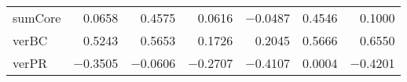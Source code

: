\begin{table}[!htbp]
\begin{tabular}{lrrrrrr}
            sumCore &   {\num{ 0.0658}} &   {\num{ 0.4575}} &   {\num{ 0.0616}} &   {\num{-0.0487}} &   {\num{ 0.4546}} &   {\num{ 0.1000}} \\
              verBC &   {\num{ 0.5243}} &   {\num{ 0.5653}} &   {\num{ 0.1726}} &   {\num{ 0.2045}} &   {\num{ 0.5666}} &   {\num{ 0.6550}} \\
              verPR &   {\num{-0.3505}} &   {\num{-0.0606}} &   {\num{-0.2707}} &   {\num{-0.4107}} &   {\num{ 0.0004}} &   {\num{-0.4201}} \\
        \bottomrule
    \end{tabular}
\end{table}





